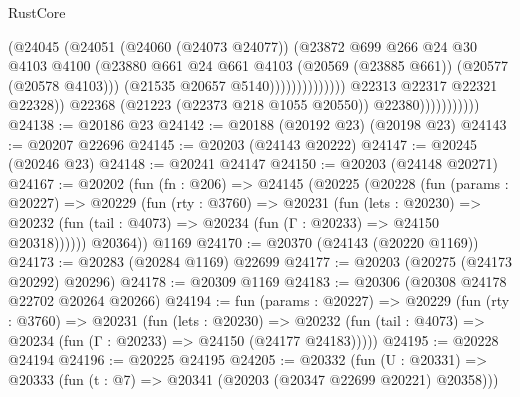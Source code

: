 \begin{lexlean}{RustCore}
\begin{coremodule}
                                                  (@24045
                                                    (@24051
                                                      (@24060 (@24073 @24077))
                                                      (@23872
                                                        @699
                                                        @266
                                                        @24
                                                        @30
                                                        @4103
                                                        @4100
                                                        (@23880
                                                          @661
                                                          @24
                                                          @661
                                                          @4103
                                                          (@20569 (@23885 @661))
                                                          (@20577 (@20578 @4103)))
                                                        (@21535 @20657 @5140))))))))))))))
                              @22313
                              @22317
                              @22321
                              @22328))
                          @22368
                          (@21223 (@22373 @218 @1055 @20550))
                          @22380)))))))))))
@24138 := @20186 @23
@24142 := @20188 (@20192 @23) (@20198 @23)
@24143 := @20207 @22696
@24145 := @20203 (@24143 @20222)
@24147 := @20245 (@20246 @23)
@24148 := @20241 @24147
@24150 := @20203 (@24148 @20271)
@24167 := @20202
    (fun (fn : @206) =>
    @24145
      (@20225
        (@20228
          (fun (params : @20227) =>
          @20229
            (fun (rty : @3760) =>
            @20231
              (fun (lets : @20230) =>
              @20232 (fun (tail : @4073) => @20234 (fun (Γ : @20233) => @24150 @20318))))))
        @20364))
    @1169
@24170 := @20370 (@24143 (@20220 @1169))
@24173 := @20283 (@20284 @1169) @22699
@24177 := @20203 (@20275 (@24173 @20292) @20296)
@24178 := @20309 @1169
@24183 := @20306 (@20308 @24178 @22702 @20264 @20266)
@24194 := fun (params : @20227) =>
  @20229
    (fun (rty : @3760) =>
    @20231
      (fun (lets : @20230) =>
      @20232 (fun (tail : @4073) => @20234 (fun (Γ : @20233) => @24150 (@24177 @24183)))))
@24195 := @20228 @24194
@24196 := @20225 @24195
@24205 := @20332
    (fun (U : @20331) => @20333 (fun (t : @7) => @20341 (@20203 (@20347 @22699 @20221) @20358)))

\end{coremodule}
\end{lexlean}
